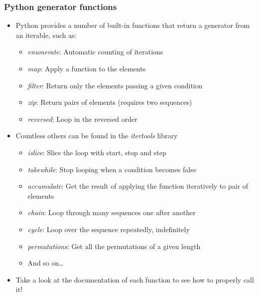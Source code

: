 \documentclass[9pt]{beamer}
\begin{document}
\begin{frame}
  \frametitle{Python generator functions}
  
  \begin{itemize}
    \item Python provides a number of built-in functions that return a generator from an iterable, such as:
    \begin{itemize}
      \item \emph{enumerate}: Automatic counting of iterations
      \item \emph{map}: Apply a function to the elements
      \item \emph{filter}: Return only the elements passing a given condition
      \item \emph{zip}: Return pairs of elements (requires two sequences)
      \item \emph{reversed}: Loop in the reversed order
    \end{itemize}

    \item Countless others can be found in the \alert{\emph{itertools}} library
    \begin{itemize}
      \item \emph{islice}: Slice the loop with start, stop and step
      \item \emph{takewhile}: Stop looping when a condition becomes false
      \item \emph{accumulate}: Get the result of applying the function iteratively to pair of elements
      \item \emph{chain}: Loop through many sequences one after another
      \item \emph{cycle}: Loop over the sequence repeatedly, indefinitely
      \item \emph{permutations}: Get all the permutations of a given length
      \item And so on\dots
    \end{itemize}
    
    \medskip
    
    \item Take a look at the documentation of each function to see how to 
          properly call it!
  \end{itemize}
  
\end{frame}
\end{document}
